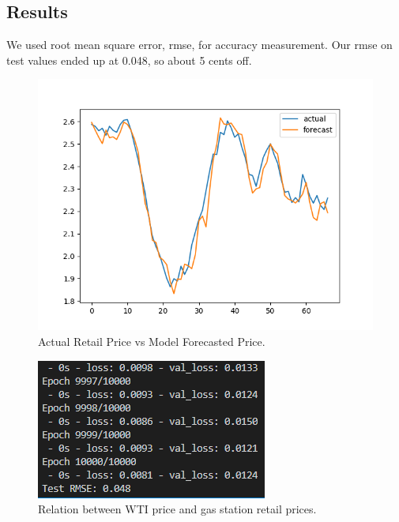 \documentclass[conference]{IEEEtran}
\begin{document}
\subsection{Results}

We used root mean square error, rmse, for accuracy measurement. Our rmse on test values ended up at 0.048, so about 5 cents off.

\begin{figure}[htbp]
\includegraphics[width=.99\linewidth]{10kActual vs Forecast.png}
\caption{Actual Retail Price vs Model Forecasted Price.}
\label{fig}
\end{figure}

\begin{figure}[htbp]
\includegraphics[width=.99\linewidth]{epoch with loss and rmse 10k cropped.png}
\caption{Relation between WTI price and gas station retail prices.}
\label{fig}
\end{figure}
\end{document}
